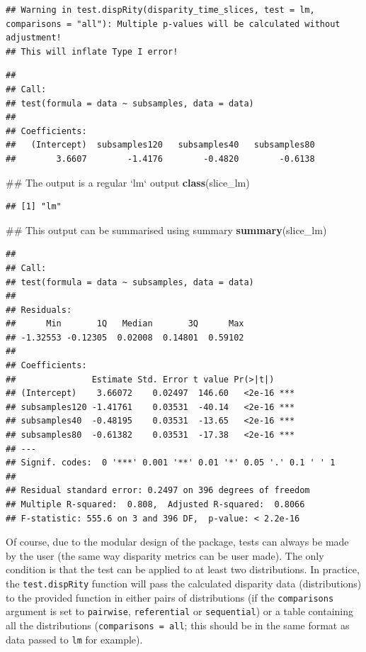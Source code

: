 \documentclass[]{book}
\newenvironment{Shaded}{\begin{snugshade}}{\end{snugshade}}
\newcommand{\KeywordTok}[1]{\textcolor[rgb]{0.13,0.29,0.53}{\textbf{#1}}}
\newcommand{\NormalTok}[1]{#1}
\theoremstyle{definition}
\theoremstyle{definition}
\theoremstyle{remark}
\begin{document}
\begin{verbatim}
## Warning in test.dispRity(disparity_time_slices, test = lm, comparisons = "all"): Multiple p-values will be calculated without adjustment!
## This will inflate Type I error!
\end{verbatim}

\begin{verbatim}
## 
## Call:
## test(formula = data ~ subsamples, data = data)
## 
## Coefficients:
##   (Intercept)  subsamples120   subsamples40   subsamples80  
##        3.6607        -1.4176        -0.4820        -0.6138
\end{verbatim}

\begin{Shaded}
\begin{Highlighting}[]
\NormalTok{## The output is a regular `lm` output}
\KeywordTok{class}\NormalTok{(slice_lm)}
\end{Highlighting}
\end{Shaded}

\begin{verbatim}
## [1] "lm"
\end{verbatim}

\begin{Shaded}
\begin{Highlighting}[]
\NormalTok{## This output can be summarised using summary}
\KeywordTok{summary}\NormalTok{(slice_lm)}
\end{Highlighting}
\end{Shaded}

\begin{verbatim}
## 
## Call:
## test(formula = data ~ subsamples, data = data)
## 
## Residuals:
##      Min       1Q   Median       3Q      Max 
## -1.32553 -0.12305  0.02008  0.14801  0.59102 
## 
## Coefficients:
##               Estimate Std. Error t value Pr(>|t|)    
## (Intercept)    3.66072    0.02497  146.60   <2e-16 ***
## subsamples120 -1.41761    0.03531  -40.14   <2e-16 ***
## subsamples40  -0.48195    0.03531  -13.65   <2e-16 ***
## subsamples80  -0.61382    0.03531  -17.38   <2e-16 ***
## ---
## Signif. codes:  0 '***' 0.001 '**' 0.01 '*' 0.05 '.' 0.1 ' ' 1
## 
## Residual standard error: 0.2497 on 396 degrees of freedom
## Multiple R-squared:  0.808,  Adjusted R-squared:  0.8066 
## F-statistic: 555.6 on 3 and 396 DF,  p-value: < 2.2e-16
\end{verbatim}

Of course, due to the modular design of the package, tests can always be
made by the user (the same way disparity metrics can be user made). The
only condition is that the test can be applied to at least two
distributions. In practice, the \texttt{test.dispRity} function will
pass the calculated disparity data (distributions) to the provided
function in either pairs of distributions (if the \texttt{comparisons}
argument is set to \texttt{pairwise}, \texttt{referential} or
\texttt{sequential}) or a table containing all the distributions
(\texttt{comparisons\ =\ all}; this should be in the same format as data
passed to \texttt{lm} for example).
\end{document}
